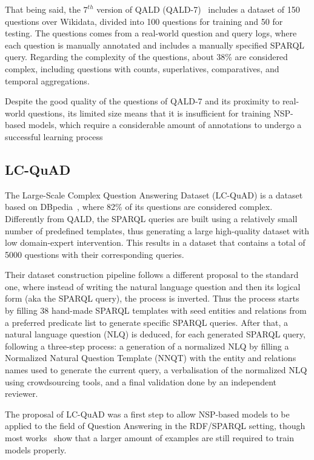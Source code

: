 That being said, the $7^{th}$ version of QALD (QALD-7)~\cite{dataset:qald7-UsbeckNHKRN17} includes a 
dataset of 150 questions over Wikidata, divided into 100 questions for training and 50 for 
testing. The questions comes from a real-world question and query logs, where each question is 
manually annotated and includes a manually specified SPARQL query. Regarding the complexity of 
the questions, about 38\% are considered complex, including questions with counts, superlatives, 
comparatives, and temporal aggregations.

Despite the good quality of the questions of QALD-7 and its proximity to real-world questions, 
its limited size means that it is insufficient for training NSP-based models, which require a 
considerable amount of annotations to undergo a successful learning process

\subsection{LC-QuAD}
The Large-Scale Complex Question Answering Dataset (LC-QuAD) is a dataset based on 
DBpedia~\cite{dataset:lcquad-TrivediMDL17}, where 82\% of its questions are considered complex. 
Differently from QALD, the SPARQL queries are built using a relatively small number of 
predefined templates, thus generating a large high-quality dataset with low domain-expert 
intervention. This results in a dataset that contains a total of 5000 questions with their 
corresponding queries.

Their dataset construction pipeline follows a different proposal to the standard one, where 
instead of writing the natural language question and then its logical form (aka the SPARQL 
query), the process is inverted. Thus the process starts by filling 38 hand-made SPARQL 
templates with seed entities and relations from a preferred predicate list to generate specific 
SPARQL queries. After that, a natural language question (NLQ) is deduced, for each generated 
SPARQL query, following a three-step process: a generation of a normalized NLQ by filling a 
Normalized Natural Question Template (NNQT) with the entity and relations names used to 
generate the current query, a verbalisation of the normalized NLQ using crowdsourcing tools, 
and a final validation done by an independent reviewer.

The proposal of LC-QuAD was a first step to allow NSP-based models to be applied to the field 
of Question Answering in the RDF/SPARQL setting, though most works~\cite{qa:FuQTLYS20abs-2007-13069} 
show that a larger amount of examples are still required to train models properly.

